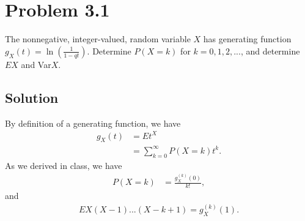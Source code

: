 \documentclass[10pt,a4paper]{article}
\author{Jeremiah Givens}
\theoremstyle{theorem}
\theoremstyle{definition}
\begin{document}
\section*{Problem 3.1}
The nonnegative, integer-valued, random variable $X$ has generating function $g_X(t) = \ln(\frac{1}{1 - qt})$. Determine $P(X = k)$ for $k = 0, 1, 2,...$, and determine $EX$ and Var$X$.

\subsection*{Solution}
By definition of a generating function, we have
\begin{align*}
g_X(t) &= Et^X\\
&= \sum_{k=0}^\infty P(X = k) t^k.
\end{align*}
As we derived in class, we have
\begin{align*}
P(X=k) &= \frac{g_{X}^{(k)}(0)}{k!},
\end{align*}
and
\begin{align}
EX(X-1)...(X - k + 1) = g_{X}^{(k)}(1).
\end{align}
\end{document}
